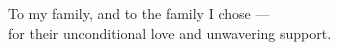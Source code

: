 To my family, and to the family I chose --- \\
for their unconditional love and unwavering support.\\

